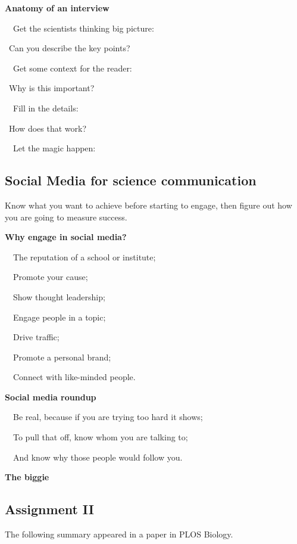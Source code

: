 \documentclass[a4paper, 12pt]{article}
\begin{document}
\textbf{Anatomy of an interview}
\par\ \textbullet\ Get the scientists thinking big picture:
\par\quad\textopenbullet\ Can you describe the key points?
\par\ \textbullet\ Get some context for the reader:
\par\quad\textopenbullet\ Why is this important?
\par\ \textbullet\ Fill in the details:
\par\quad\textopenbullet\ How does that work?
\par\ \textbullet\ Let the magic happen:

\newpage\subsection{Social Media for science communication}

Know what you want to achieve before starting to engage, then figure out how you are going to measure success.

\textbf{Why engage in social media?}
\par\ \textbullet\ The reputation of a school or institute;
\par\ \textbullet\ Promote your cause;
\par\ \textbullet\ Show thought leadership;
\par\ \textbullet\ Engage people in a topic;
\par\ \textbullet\ Drive traffic;
\par\ \textbullet\ Promote a personal brand;
\par\ \textbullet\ Connect with like-minded people.

\textbf{Social media roundup}
\par\ \textbullet\ Be real, because if you are trying too hard it shows;
\par\ \textbullet\ To pull that off, know whom you are talking to;
\par\ \textbullet\ And know why those people would follow you.

\textbf{The biggie}

\newpage\subsection{Assignment II}

The following summary appeared in a paper in PLOS Biology.
\end{document}
